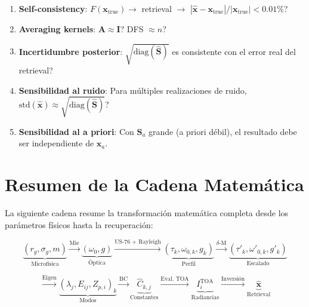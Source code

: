 \documentclass[a4paper,11pt]{article}
\begin{document}
\begin{enumerate}
    \item \textbf{Self-consistency}: $F(\mathbf{x}_{\text{true}}) \to$
          retrieval $\to$ $|\hat{\mathbf{x}} - \mathbf{x}_{\text{true}}|
          / |\mathbf{x}_{\text{true}}| < 0.01\%$?

    \item \textbf{Averaging kernels}: $\mathbf{A} \approx \mathbf{I}$?
          DFS $\approx n$?

    \item \textbf{Incertidumbre posterior}: $\sqrt{\text{diag}(\hat{\mathbf{S}})}$
          es consistente con el error real del retrieval?

    \item \textbf{Sensibilidad al ruido}: Para m\'ultiples realizaciones de
          ruido, $\text{std}(\hat{\mathbf{x}}) \approx
          \sqrt{\text{diag}(\hat{\mathbf{S}})}$?

    \item \textbf{Sensibilidad al a priori}: Con $\mathbf{S}_a$ grande (a priori
          d\'ebil), el resultado debe ser independiente de $\mathbf{x}_a$.
\end{enumerate}


\section{Resumen de la Cadena Matem\'atica}

La siguiente cadena resume la transformaci\'on matem\'atica completa desde
los par\'ametros f\'isicos hasta la recuperaci\'on:

\begin{equation*}
    \underbrace{(r_g, \sigma_g, m)}_{\text{Microf\'isica}}
    \xrightarrow{\text{Mie}}
    \underbrace{(\omega_0, g)}_{\text{\'Optica}}
    \xrightarrow{\text{US-76 + Rayleigh}}
    \underbrace{(\tau_k, \omega_{0,k}, g_k)}_{\text{Perfil}}
    \xrightarrow{\delta\text{-M}}
    \underbrace{(\tau'_k, \omega'_{0,k}, g'_k)}_{\text{Escalado}}
\end{equation*}

\begin{equation*}
    \xrightarrow{\text{Eigen}}
    \underbrace{(\lambda_j, E_{ij}, Z_{p,i})_k}_{\text{Modos}}
    \xrightarrow{\text{BC}}
    \underbrace{\hat{C}_{k,j}}_{\text{Constantes}}
    \xrightarrow{\text{Eval.\ TOA}}
    \underbrace{I_i^{\text{TOA}}}_{\text{Radiancias}}
    \xrightarrow{\text{Inversi\'on}}
    \underbrace{\hat{\mathbf{x}}}_{\text{Retrieval}}
\end{equation*}
\end{document}
